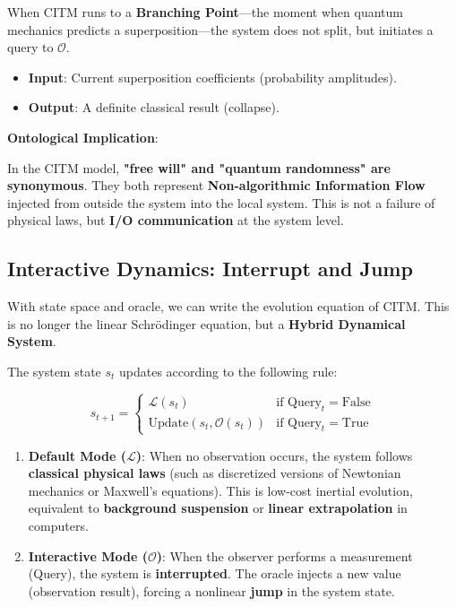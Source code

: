 When CITM runs to a \textbf{Branching Point}—the moment when quantum mechanics predicts a superposition—the system does not split, but initiates a query to $\mathcal{O}$.

\begin{itemize}
\item \textbf{Input}: Current superposition coefficients (probability amplitudes).

\item \textbf{Output}: A definite classical result (collapse).
\end{itemize}

\textbf{Ontological Implication}:

In the CITM model, \textbf{"free will" and "quantum randomness" are synonymous}. They both represent \textbf{Non-algorithmic Information Flow} injected from outside the system into the local system. This is not a failure of physical laws, but \textbf{I/O communication} at the system level.

\subsection{Interactive Dynamics: Interrupt and Jump}

With state space and oracle, we can write the evolution equation of CITM. This is no longer the linear Schrödinger equation, but a \textbf{Hybrid Dynamical System}.

The system state $s_t$ updates according to the following rule:

\begin{equation}
s_{t+1} = 
\begin{cases} 
\mathcal{L}(s_t) & \text{if } \text{Query}_t = \text{False} \\
\text{Update}(s_t, \mathcal{O}(s_t)) & \text{if } \text{Query}_t = \text{True} 
\end{cases}
\end{equation}

\begin{enumerate}
\item \textbf{Default Mode ($\mathcal{L}$)}: When no observation occurs, the system follows \textbf{classical physical laws} (such as discretized versions of Newtonian mechanics or Maxwell's equations). This is low-cost inertial evolution, equivalent to \textbf{background suspension} or \textbf{linear extrapolation} in computers.

\item \textbf{Interactive Mode ($\mathcal{O}$)}: When the observer performs a measurement (Query), the system is \textbf{interrupted}. The oracle injects a new value (observation result), forcing a nonlinear \textbf{jump} in the system state.
\end{enumerate}

